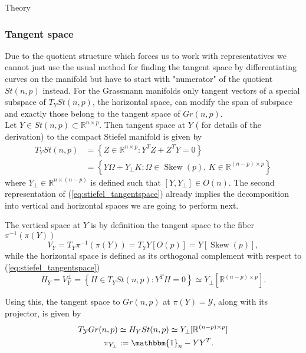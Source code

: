 \begin{chapter}{Theory}

\subsubsection{Tangent space} %
\label{ssub:Tangent space}
Due to the quotient structure which forces us to work with representatives we cannot just use the usual method for finding the tangent space by differentiating
curves on the manifold but have to start with "numerator" of the quotient $St(n,p)$ instead. For the Grassmann manifolds only tangent vectors of a special subspace of $T_YSt(n,p)$,
the horizontal space, can modify the span of subspace and exactly those belong to the tangent space of $Gr(n,p)$. \\

Let $Y\in St(n,p)\subset\mathbb{R}^{n\times p}$. Then tangent space at $Y$ (\cite{Absil2009} for details of the derivation) to the compact Stiefel manifold is given by
\begin{align}
    \label{eq:stiefel_tangentspace}
   T_YSt(n,p)	&= \left\lbrace Z\in\mathbb{R}^{n\times p}: Y^TZ+Z^TY=0 \right\rbrace\\
   &=  \left\lbrace Y\Omega + Y_{\bot}K: \Omega\in\operatorname{Skew}(p),\, K\in\mathbb{R}^{(n-p)\times p} \right\rbrace\nonumber
\end{align}
where $Y_{\bot}\in\mathbb{R}^{n\times (n-p)}$ is defined such that $[Y,Y_{\bot}]\in O(n)$. The second representation of (\ref{eq:stiefel_tangentspace})
already implies the decomposition into vertical and horizontal spaces we are going to perform next.

The vertical space at $Y$ is by definition the tangent space to the fiber $\pi^{-1}(\pi(Y))$
\begin{equation}
    \label{eq:stiefel_horizontalspace}
    V_Y = T_Y\pi^{-1}(\pi(Y))=T_YY[O(p)]=Y[\operatorname{Skew}(p)],
\end{equation}
while the horizontal space is defined as its orthogonal complement with respect to (\ref{eq:stiefel_tangentspace})
\begin{equation}
    \label{eq:stiefel_verticalspace}
    H_Y=V_Y^{\bot} =\left\lbrace H\in T_Y St(n,p):Y^TH=0 \right\rbrace \simeq Y_{\bot}[\mathbb{R}^{(n-p)\times p}].
\end{equation}

Using this, the tangent space to $Gr(n,p)$ at $\pi(Y)=\mathcal{Y}$, along with its projector, is given by 
\begin{align}
    \label{eq:grassmann_tangentspace}
    T_{\mathcal{Y}}Gr(n,p)&\simeq  H_YSt(n,p)\simeq Y_{\bot}[\mathbb{R}^{(n-p)\times p}]\\
    \pi_{Y_{\bot}}&:=\mathbbm{1}_n-YY^T.
\end{align}


\end{chapter}
